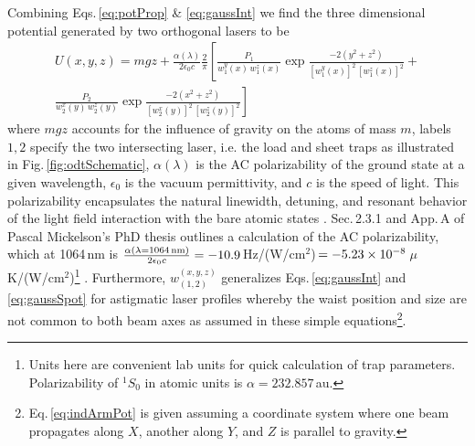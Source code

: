Combining Eqs.\,\ref{eq:potProp} \& \ref{eq:gaussInt} we find the three dimensional potential generated by two orthogonal lasers to be
\begin{equation} \label{eq:indArmPot}
\begin{split}
	U(x,y,z) = m g z + \frac{\alpha(\lambda)}{2 \epsilon_0 c} \frac{2}{\pi} \left[ \frac{P_1}{w_1^y(x)\, w_1^z(x)} \exp{\frac{-2 (y^2+z^2)}{[w_1^y(x)]^2 \,[w_1^z(x)]^2}} + \right. \\
	\left. \frac{P_2}{w_2^x(y)\, w_2^z(y)} \exp{\frac{-2 (x^2+z^2)}{[w_2^x(y)]^2\,[w_2^z(y)]^2}} \right]
\end{split}
\end{equation}
where $mgz$ accounts for the influence of gravity on the atoms of mass $m$, labels $1,2$ specify the two intersecting laser, i.e. the load and sheet traps as illustrated in Fig.\,\ref{fig:odtSchematic}, $\alpha(\lambda)$ is the AC polarizability of the ground state at a given wavelength, $\epsilon_0$ is the vacuum permittivity, and $c$ is the speed of light.
This polarizability encapsulates the natural linewidth, detuning, and resonant behavior of the light field interaction with the bare atomic states \cite{Grimm1999a}.
Sec.\,2.3.1 and App.\,A of Pascal Mickelson's PhD thesis \cite{Mickelson2010b} outlines a calculation of the AC polarizability, which at 1064\,nm is $\frac{\alpha( \lambda = \text{1064\,nm} )}{2 \epsilon_0 c} = -10.9$\,Hz/(W/cm$^2$)\,$=-5.23\times 10^{-8}$\,$\mu$K/(W/cm$^2$)\footnote{Units here are convenient lab units for quick calculation of trap parameters. Polarizability of $^1S_0$ in atomic units is $\alpha = 232.857$\,au.}  \cite{Ye2008}.
Furthermore, $w_{(1,2)}^{(x,y,z)}$ generalizes Eqs.\,\ref{eq:gaussInt} and \ref{eq:gaussSpot} for astigmatic laser profiles whereby the waist position and size are not common to both beam axes as assumed in these simple equations\footnote{Eq.\,\ref{eq:indArmPot} is given assuming a coordinate system where one beam propagates along $X$, another along $Y$, and $Z$ is parallel to gravity.}.

